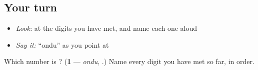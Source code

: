 \subsection*{Your turn}
\begin{itemize}
\raggedright
  \item \emph{Look:} at the digits you have met, and name each one aloud
\end{itemize}

\begin{quote}
\end{quote}

\begin{itemize}
\raggedright
  \item \emph{Say it:} \textquotedblleft{}ondu\textquotedblright{} as you point at 
\end{itemize}

\begin{tcolorbox}[breakable,colback=teal!4,colframe=teal!35!black,title={Before you move on}]
Which number is \textbf{}? (\textbf{1} — \emph{ondu}, .) Name every digit you have met so far, in order.
\end{tcolorbox}
